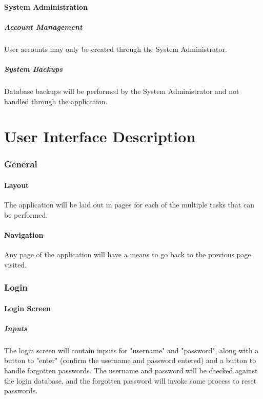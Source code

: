 \documentclass{article}
\begin{document}
\subsection{System Administration}
\subsubsection{Account Management}
User accounts may only be created through the System Administrator.
\subsubsection{System Backups}
Database backups will be performed by the System Administrator and not handled
through the application.

\part{User Interface Description}

\section{General}
\subsection{Layout}
The application will be laid out in pages for each of the multiple tasks that
can be performed.
\subsection{Navigation}
Any page of the application will have a means to go back to the previous
page visited.

\section{Login}
\subsection{Login Screen}
\subsubsection{Inputs}
The login screen will contain inputs for "username" and "password", along with a
button to "enter" (confirm the username and password entered) and a button to handle
forgotten passwords. The username and password will be checked against the login database,
and the forgotten password will invoke some process to reset passwords.
\end{document}
